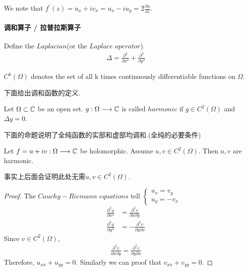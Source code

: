 	\begin{rmk}
		We note that $f^{'}(z) = u_x + i v_x = u_x - i u_y = 2 \frac{\partial u}{\partial z}$.
	\end{rmk}

\newpage
\paragraph{调和算子 / 拉普拉斯算子}
	Define the \underline{$Laplacian$}(or the \underline{$Laplace \,\, operator$}).
	\begin{align}
		\Delta = \frac{\partial^2}{\partial x^2} + \frac{\partial^2}{\partial y^2}
	\end{align}
	
	\begin{rmk}
		$C^{k}(\Omega)$ denotes the set of all k times continuously differentiable functions on $\Omega$.
	\end{rmk}
	
	\vspace{2em}
	下面给出调和函数的定义.
	\begin{defn}\label{def 2.5.1}
		Let $\Omega \subset \mathbb{C}$ be an open set. $g : \Omega \longrightarrow \mathbb{C}$ is called \underline{$harmonic$} if $g \in C^{2}(\Omega)$ and $\Delta g = 0$.
	\end{defn}
	
	\vspace{2em}
	下面的命题说明了全纯函数的实部和虚部均调和.(全纯的必要条件)
	\begin{proposition}\label{prop 2.5.2}
		Let $f = u + i v : \Omega \longrightarrow \mathbb{C}$ be holomorphic. Assume $u , v \in C^{2}(\Omega)$. Then $u , v$ are harmonic.
		
		\begin{rmk}
			事实上后面会证明此处无需$u , v \in C^{2}(\Omega)$.
		\end{rmk}
		
		\vspace{2em}
		\begin{proof}
			The $Cauchy - Riemann \,\, equations$ tell $
			\begin{cases}
				u_x = v_y \\
				u_y = - v_x
			\end{cases}$
			\begin{align}
					\frac{\partial^2 u}{\partial x^2} &= \frac{\partial^2 v}{\partial x \partial y} \\
					\frac{\partial^2 u}{\partial y^2} &= -\frac{\partial^2 v}{\partial y \partial x}
			\end{align}
			Since $v \in C^{2}(\Omega)$, 
			\begin{align}
				\frac{\partial^2 v}{\partial x \partial y} = \frac{\partial^2 v}{\partial y \partial x}
			\end{align}
			Therefore, $u_{xx} + u_{yy} = 0$. Similarly we can proof that $v_{xx} + v_{yy} = 0$.
		\end{proof}
	\end{proposition}
	
